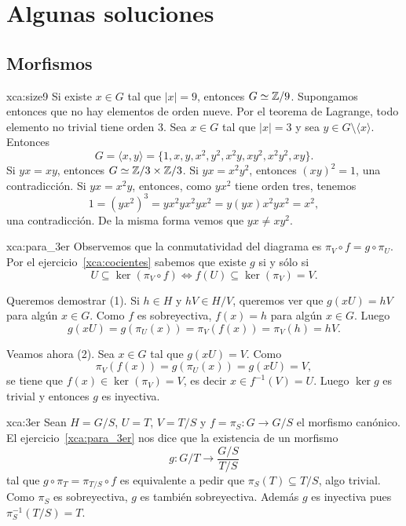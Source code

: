 \chapter{Algunas soluciones}

\section*{Morfismos}

\begin{sol}{xca:size9}
Si existe $x\in G$ tal que $|x|=9$, entonces $G\simeq\mathbb{Z}/9$. Supongamos entonces que no hay elementos de orden nueve. Por el teorema
de Lagrange, todo elemento no trivial tiene orden 3. Sea $x\in G$ tal que $|x|=3$ y sea $y\in G\setminus\langle x\rangle$. 
Entonces 
\[
G=\langle x,y\rangle=\{1,x,y,x^2,y^2,x^2y,xy^2,x^2y^2,xy\}.
\]
Si $yx=xy$, entonces $G\simeq\mathbb{Z}/3\times\mathbb{Z}/3$. 
Si $yx=x^2y^2$, entonces $(xy)^2=1$, una contradicción. 
Si $yx=x^2y$, entonces, como $yx^2$ tiene orden tres, tenemos
\[
1=(yx^2)^3=yx^2yx^2yx^2=y(yx)x^2yx^2=x^2,
\]
una contradicción. De la misma forma vemos que $yx\ne xy^2$. 
\end{sol}

\begin{sol}{xca:para_3er}
	Observemos que la conmutatividad del diagrama es $\pi_V\circ f=g\circ \pi_U$. 
	Por el ejercicio~\ref{xca:cocientes} sabemos 
	que existe $g$ si y sólo si 
	\[
	U\subseteq \ker(\pi_V\circ f)\Longleftrightarrow f(U)\subseteq\ker(\pi_V)=V.
	\] 
	
	Queremos demostrar (1). Si $h\in H$ y $hV\in H/V$, queremos ver que $g(xU)=hV$ para algún $x\in G$. 
	Como $f$ es sobreyectiva, $f(x)=h$ para algún $x\in G$. Luego
	\[
	g(xU)=g(\pi_U(x))=\pi_V(f(x))=\pi_V(h)=hV.
	\]
	
	Veamos ahora (2). Sea $x\in G$ tal que $g(xU)=V$. Como
	\[
	\pi_V(f(x))=g(\pi_U(x))=g(xU)=V,
	\]
	se tiene que $f(x)\in\ker(\pi_V)=V$, es decir $x\in f^{-1}(V)=U$. Luego $\ker g$ es trivial y entonces $g$ es inyectiva. 
\end{sol}

\begin{sol}{xca:3er}
    Sean $H=G/S$, $U=T$, $V=T/S$ y $f=\pi_S\colon G\to G/S$ el morfismo canónico. 
    El ejercicio~\ref{xca:para_3er} nos dice que 
	la existencia de un morfismo  
	\[
	g\colon G/T\to\frac{G/S}{T/S}
	\]
	tal que $g\circ\pi_T=\pi_{T/S}\circ f$  
	es equivalente a pedir que $\pi_S(T)\subseteq T/S$, algo trivial. Como $\pi_S$ es sobreyectiva, $g$ es también sobreyectiva. Además $g$ es inyectiva pues
	$\pi_S^{-1}(T/S)=T$. 
\end{sol}

